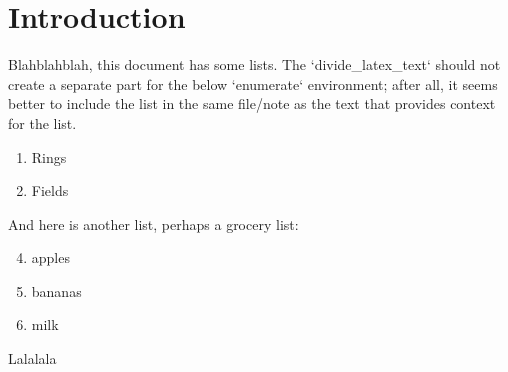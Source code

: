 \documentclass[10pt]{article}
\begin{document}
\section{Introduction}

Blahblahblah, this document has some lists.
The `divide_latex_text` should not create a separate part for the below `enumerate`
environment; after all, it seems better to include the list in the same file/note
as the text that provides context for the list.

\begin{enumerate}
  \item Rings
  \item Fields
\end{enumerate}

And here is another list, perhaps a grocery list:

\begin{enumerate}
  \setcounter{enumi}{3}
  \item apples
  \item bananas
  \item milk
\end{enumerate}

Lalalala
\end{document}
